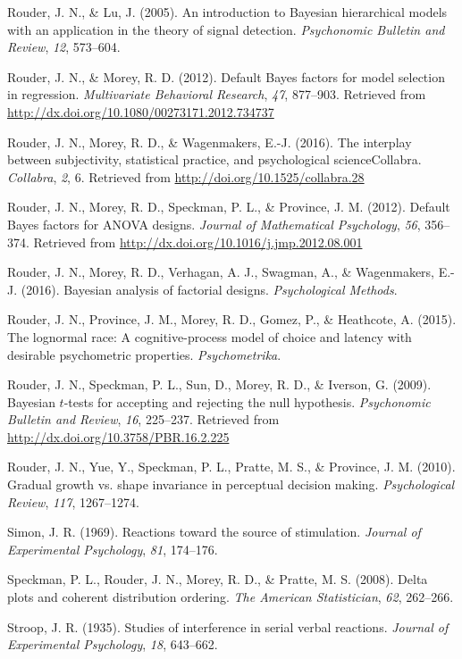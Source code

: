 \documentclass[american,man]{apa6}
\begin{document}
Rouder, J. N., \& Lu, J. (2005). An introduction to Bayesian
hierarchical models with an application in the theory of signal
detection. \emph{Psychonomic Bulletin and Review}, \emph{12}, 573--604.

Rouder, J. N., \& Morey, R. D. (2012). Default Bayes factors for model
selection in regression. \emph{Multivariate Behavioral Research},
\emph{47}, 877--903. Retrieved from
\url{http://dx.doi.org/10.1080/00273171.2012.734737}

Rouder, J. N., Morey, R. D., \& Wagenmakers, E.-J. (2016). The interplay
between subjectivity, statistical practice, and psychological
scienceCollabra. \emph{Collabra}, \emph{2}, 6. Retrieved from
\url{http://doi.org/10.1525/collabra.28}

Rouder, J. N., Morey, R. D., Speckman, P. L., \& Province, J. M. (2012).
Default Bayes factors for ANOVA designs. \emph{Journal of Mathematical
Psychology}, \emph{56}, 356--374. Retrieved from
\url{http://dx.doi.org/10.1016/j.jmp.2012.08.001}

Rouder, J. N., Morey, R. D., Verhagan, A. J., Swagman, A., \&
Wagenmakers, E.-J. (2016). Bayesian analysis of factorial designs.
\emph{Psychological Methods}.

Rouder, J. N., Province, J. M., Morey, R. D., Gomez, P., \& Heathcote,
A. (2015). The lognormal race: A cognitive-process model of choice and
latency with desirable psychometric properties. \emph{Psychometrika}.

Rouder, J. N., Speckman, P. L., Sun, D., Morey, R. D., \& Iverson, G.
(2009). Bayesian \(t\)-tests for accepting and rejecting the null
hypothesis. \emph{Psychonomic Bulletin and Review}, \emph{16}, 225--237.
Retrieved from \url{http://dx.doi.org/10.3758/PBR.16.2.225}

Rouder, J. N., Yue, Y., Speckman, P. L., Pratte, M. S., \& Province, J.
M. (2010). Gradual growth vs. shape invariance in perceptual decision
making. \emph{Psychological Review}, \emph{117}, 1267--1274.

Simon, J. R. (1969). Reactions toward the source of stimulation.
\emph{Journal of Experimental Psychology}, \emph{81}, 174--176.

Speckman, P. L., Rouder, J. N., Morey, R. D., \& Pratte, M. S. (2008).
Delta plots and coherent distribution ordering. \emph{The American
Statistician}, \emph{62}, 262--266.

Stroop, J. R. (1935). Studies of interference in serial verbal
reactions. \emph{Journal of Experimental Psychology}, \emph{18},
643--662.
\end{document}
